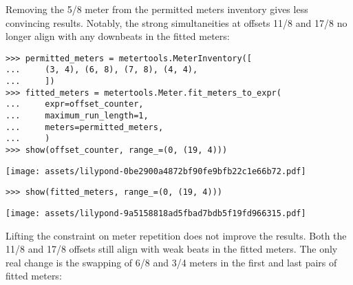 \noindent Removing the 5/8 meter from the permitted meters inventory gives less
convincing results. Notably, the strong simultaneities at offsets 11/8 and 17/8
no longer align with any downbeats in the fitted meters:

\begin{comment}
<abjad>
permitted_meters = metertools.MeterInventory([
    (3, 4), (6, 8), (7, 8), (4, 4),
    ])
fitted_meters = metertools.Meter.fit_meters_to_expr(
    expr=offset_counter,
    maximum_run_length=1,
    meters=permitted_meters,
    )
show(offset_counter, range_=(0, (19, 4)))
show(fitted_meters, range_=(0, (19, 4)))
</abjad>
\end{comment}

\begin{abjadbookoutput}
\begin{singlespacing}
\vspace{-0.5\baselineskip}
\begin{lstlisting}
>>> permitted_meters = metertools.MeterInventory([
...     (3, 4), (6, 8), (7, 8), (4, 4),
...     ])
>>> fitted_meters = metertools.Meter.fit_meters_to_expr(
...     expr=offset_counter,
...     maximum_run_length=1,
...     meters=permitted_meters,
...     )
>>> show(offset_counter, range_=(0, (19, 4)))
\end{lstlisting}
\noindent\texttt{[image: assets/lilypond-0be2900a4872bf90fe9bfb22c1e66b72.pdf]}
\begin{lstlisting}
>>> show(fitted_meters, range_=(0, (19, 4)))
\end{lstlisting}
\noindent\texttt{[image: assets/lilypond-9a5158818ad5fbad7bdb5f19fd966315.pdf]}
\end{singlespacing}
\end{abjadbookoutput}

\noindent Lifting the constraint on meter repetition does not improve the
results. Both the 11/8 and 17/8 offsets still align with weak beats in the
fitted meters. The only real change is the swapping of 6/8 and 3/4 meters in
the first and last pairs of fitted meters:

\begin{comment}
<abjad>
fitted_meters = metertools.Meter.fit_meters_to_expr(
    expr=offset_counter,
    meters=permitted_meters,
    )
show(offset_counter, range_=(0, (19, 4)))
show(fitted_meters, range_=(0, (19, 4)))
</abjad>
\end{comment}

